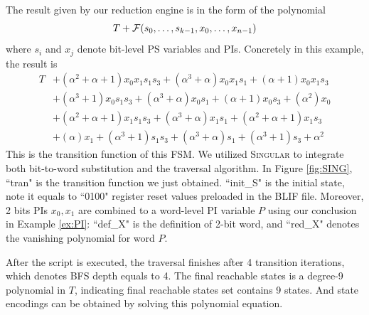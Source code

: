 \begin{Example}
The result given by our reduction engine is in the form of the polynomial
$$T+{\mathcal{F}}(s_0,\dots,s_{k-1},x_0,\dots,x_{n-1})$$ 
where $s_i$ and $x_j$ denote bit-level PS variables and PIs. Concretely in this example, the result is
\begin{align*}
T&+(\alpha^2+\alpha+1) x_0 x_1 s_1 s_3+(\alpha^3+\alpha) x_0 x_1 s_1+(\alpha+1) x_0 x_1 s_3 \\
&+(\alpha^3+1) x_0 s_1 s_3+(\alpha^3+\alpha) x_0 s_1 +(\alpha+1) x_0 s_3+(\alpha^2) x_0 \\
&+(\alpha^2+\alpha+1) x_1 s_1 s_3+(\alpha^3+\alpha) x_1 s_1+(\alpha^2+\alpha+1) x_1 s_3\\
&+(\alpha) x_1+(\alpha^3+1) s_1 s_3+(\alpha^3+\alpha) s_1+(\alpha^3+1) s_3+\alpha^2
\end{align*}
This is the transition function of this FSM. We utilized \textsc{Singular} to integrate both 
bit-to-word substitution and the traversal algorithm. In Figure \ref{fig:SING}, ``tran" is the transition
function we just obtained. ``init\_S" is the initial state, note it equals to ``0100" register 
reset values preloaded in the BLIF file. Moreover, 2 bits PIs $x_0,x_1$ are combined to a word-level 
PI variable $P$ using our conclusion in Example \ref{ex:PI}: ``def\_X" is the definition of 2-bit 
word, and ``red\_X" denotes the vanishing polynomial for word $P$.


After the script is executed, the traversal finishes after 4 
transition iterations, which denotes BFS depth equals to 4. The final reachable states 
is a degree-9 polynomial in $T$, indicating final reachable states set contains 9 states.
And state encodings can be obtained by solving this polynomial equation.


\end{Example}
